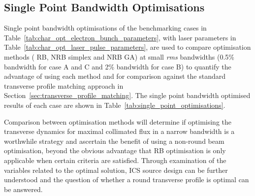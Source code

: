 \documentclass[../main.tex]{subfiles}
\begin{document}
\subsection{Single Point Bandwidth Optimisations}

Single point bandwidth optimisations of the benchmarking cases in Table~\ref{tab:char_opt_electron_bunch_parameters}, with laser parameters in Table~\ref{tab:char_opt_laser_pulse_parameters}, are used to compare optimisation methods ( RB, NRB simplex and NRB GA) at small \textit{rms} bandwidths (0.5\%  bandwidth for case A and C and 2\%  bandwidth for case B) to quantify the advantage of using each method and for comparison against the standard transverse profile matching approach in Section~\ref{sec:transverse_profile_matching}. The single point bandwidth optimised results of each case are shown in Table~\ref{tab:single_point_optimisations}. 

Comparison between optimisation methods will determine if optimising the transverse dynamics for maximal collimated flux in a narrow bandwidth is a worthwhile strategy and ascertain the benefit of using a non-round beam optimisation, beyond the obvious advantage that RB optimisation is only applicable when certain criteria are satisfied. Through examination of the variables related to the optimal solution, ICS source design can be further understood and the question of whether a round transverse profile is optimal can be answered.      
\end{document}
